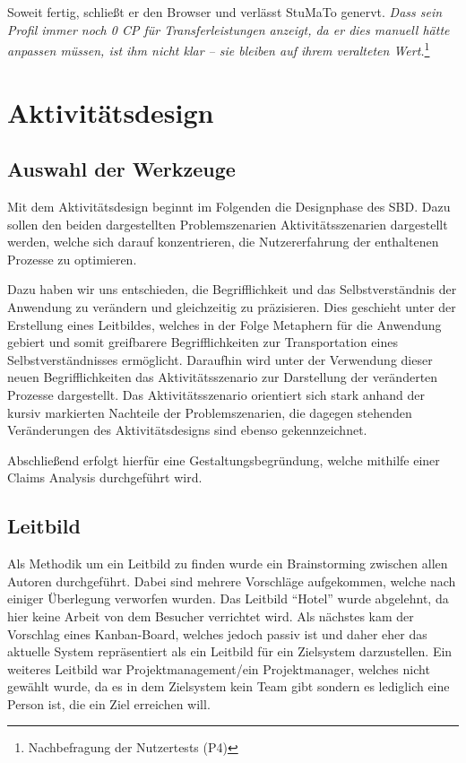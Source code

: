 \documentclass[
  12pt,
  ngerman,
  a4paper,
]{article}
\begin{document}
Soweit fertig, schließt er den Browser und verlässt StuMaTo genervt.
\emph{Dass sein Profil immer noch 0 CP für Transferleistungen anzeigt,
da er dies manuell hätte anpassen müssen, ist ihm nicht klar -- sie
bleiben auf ihrem veralteten Wert.}\footnote{Nachbefragung der
  Nutzertests (P4)}

\hypertarget{aktivituxe4tsdesign}{%
\section{Aktivitätsdesign}\label{aktivituxe4tsdesign}}

\hypertarget{auswahl-der-werkzeuge}{%
\subsection{Auswahl der Werkzeuge}\label{auswahl-der-werkzeuge}}

Mit dem Aktivitätsdesign beginnt im Folgenden die Designphase des SBD.
Dazu sollen den beiden dargestellten Problemszenarien
Aktivitätsszenarien dargestellt werden, welche sich darauf
konzentrieren, die Nutzererfahrung der enthaltenen Prozesse zu
optimieren.

Dazu haben wir uns entschieden, die Begrifflichkeit und das
Selbstverständnis der Anwendung zu verändern und gleichzeitig zu
präzisieren. Dies geschieht unter der Erstellung eines Leitbildes,
welches in der Folge Metaphern für die Anwendung gebiert und somit
greifbarere Begrifflichkeiten zur Transportation eines
Selbstverständnisses ermöglicht. Daraufhin wird unter der Verwendung
dieser neuen Begrifflichkeiten das Aktivitätsszenario zur Darstellung
der veränderten Prozesse dargestellt. Das Aktivitätsszenario orientiert
sich stark anhand der kursiv markierten Nachteile der Problemszenarien,
die dagegen stehenden Veränderungen des Aktivitätsdesigns sind ebenso
gekennzeichnet.

Abschließend erfolgt hierfür eine Gestaltungsbegründung, welche mithilfe
einer Claims Analysis durchgeführt wird.

\hypertarget{leitbild}{%
\subsection{Leitbild}\label{leitbild}}

Als Methodik um ein Leitbild zu finden wurde ein Brainstorming zwischen
allen Autoren durchgeführt. Dabei sind mehrere Vorschläge aufgekommen,
welche nach einiger Überlegung verworfen wurden. Das Leitbild ``Hotel''
wurde abgelehnt, da hier keine Arbeit von dem Besucher verrichtet wird.
Als nächstes kam der Vorschlag eines Kanban-Board, welches jedoch passiv
ist und daher eher das aktuelle System repräsentiert als ein Leitbild
für ein Zielsystem darzustellen. Ein weiteres Leitbild war
Projektmanagement/ein Projektmanager, welches nicht gewählt wurde, da es
in dem Zielsystem kein Team gibt sondern es lediglich eine Person ist,
die ein Ziel erreichen will.
\end{document}
